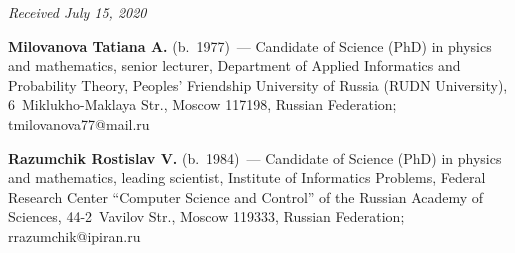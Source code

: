 \vspace*{-6pt}

\hfill{\small\textit{Received July 15, 2020}}



\Contr

\noindent
\textbf{Milovanova Tatiana A.} (b.\ 1977)~---
Candidate of Science (PhD) in physics and mathematics, senior lecturer,
Department of Applied Informatics and Probability Theory,
Peoples' Friendship University of Russia (RUDN University), 
6~Miklukho-Maklaya Str., Moscow 117198, Russian Federation; 
\mbox{tmilovanova77@mail.ru}

\vspace*{4pt}

\noindent
\textbf{Razumchik Rostislav V.} (b.\ 1984)~---
Candidate of Science (PhD) in physics and mathematics, leading scientist,
Institute of Informatics Problems, Federal Research Center 
``Computer Science and Control'' of the Russian Academy of Sciences, 
44-2~Vavilov Str., Moscow 119333, Russian Federation; \mbox{rrazumchik@ipiran.ru}
\label{end\stat}

\renewcommand{\bibname}{\protect\rm Литература} 

\renewcommand{\figurename}{\protect\bf Рис.}